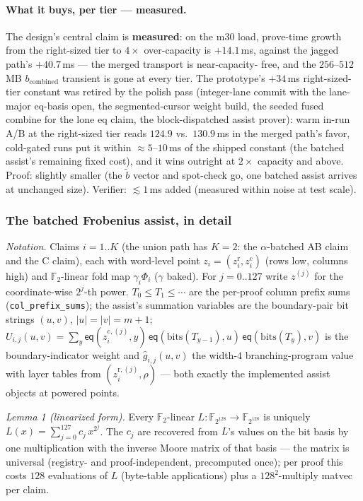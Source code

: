 \documentclass[11pt]{article}
\newcommand{\F}{\mathbb{F}}                       %
\newcommand{\eq}{\mathsf{eq}}
\newcommand{\code}[1]{\texttt{#1}}
\theoremstyle{definition}
\begin{document}
\paragraph{What it buys, per tier --- measured.} The design's central
claim is \textbf{measured}: on the m30 load, prove-time growth from the
right-sized tier to $4\times$ over-capacity is $+14.1$\,ms, against the
jagged path's $+40.7$\,ms --- the merged transport is near-capacity-%
free, and the $256$--$512$\,MB $b_{\mathrm{combined}}$ transient is
gone at every tier. The prototype's $+34$\,ms right-sized-tier constant
was retired by the polish pass (integer-lane commit with the lane-major
eq-basis open, the segmented-cursor weight build, the seeded fused
combine for the lone eq claim, the block-dispatched assist prover):
warm in-run A/B at the right-sized tier reads $124.9$ vs.\
$130.9$\,ms in the merged path's favor, cold-gated runs put it within
$\approx 5$--$10$\,ms of the shipped constant (the batched assist's
remaining fixed cost), and it wins outright at $2\times$ capacity and
above. Proof: slightly smaller (the $\tilde b$ vector and
spot-check go, one batched assist arrives at unchanged size).
Verifier: $\lesssim 1$\,ms added (measured within noise at test
scale).

\subsubsection*{The batched Frobenius assist, in detail}

\emph{Notation.} Claims $i = 1..K$ (the union path has $K = 2$: the
$\alpha$-batched AB claim and the C claim), each with word-level point
$z_i = (z_i^{\mathrm{r}}, z_i^{\mathrm{c}})$ (rows low, columns high)
and $\F_2$-linear fold map $\gamma_i\Phi_i$ ($\gamma$ baked). For
$j = 0..127$ write $z^{(j)}$ for the coordinate-wise $2^j$-th power.
$T_0 \le T_1 \le \cdots$ are the per-proof column prefix sums
(\code{col\_prefix\_sums}); the assist's summation variables are the
boundary-pair bit strings $(u, v)$, $|u| = |v| = m{+}1$;
$U_{i,j}(u,v) = \sum_y \eq(z_i^{\mathrm{c},(j)}, y)\,
\eq(\mathrm{bits}(T_{y-1}), u)\,\eq(\mathrm{bits}(T_y), v)$ is the
boundary-indicator weight and $\hat g_{i,j}(u,v)$ the width-$4$
branching-program value with layer tables from
$(z_i^{\mathrm{r},(j)}, \rho)$ --- both exactly the implemented assist
objects at powered points.

\emph{Lemma 1 (linearized form).} Every $\F_2$-linear
$L : \F_{2^{128}} \to \F_{2^{128}}$ is uniquely
$L(x) = \sum_{j=0}^{127} c_j\,x^{2^j}$. The $c_j$ are recovered from
$L$'s values on the bit basis by one multiplication with the inverse
Moore matrix of that basis --- the matrix is universal (registry- and
proof-independent, precomputed once); per proof this costs $128$
evaluations of $L$ (byte-table applications) plus a $128^2$-multiply
matvec per claim.
\end{document}
